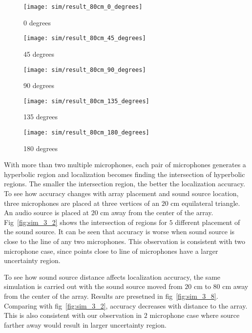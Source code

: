 \begin{figure*}[]
  \centering
  \begin{subfigure}[]{.3\textwidth}
    \texttt{[image: sim/result\_80cm\_0\_degrees]}
    \caption{0 degrees}
  \end{subfigure}
  \begin{subfigure}[]{.3\textwidth}
    \texttt{[image: sim/result\_80cm\_45\_degrees]}
    \caption{45 degrees}
  \end{subfigure}
  \begin{subfigure}[]{.3\textwidth}
    \texttt{[image: sim/result\_80cm\_90\_degrees]}
    \caption{90 degrees}
  \end{subfigure}
  \begin{subfigure}[]{.3\textwidth}
    \texttt{[image: sim/result\_80cm\_135\_degrees]}
    \caption{135 degrees}
  \end{subfigure}
  \begin{subfigure}[]{.3\textwidth}
    \texttt{[image: sim/result\_80cm\_180\_degrees]}
    \caption{180 degrees}
  \end{subfigure}
  \caption{$20$ cm equilateral triangle array. Source is $80$ cm away from the array}
  \label{fig:sim_3_8}
\end{figure*}

With more than two multiple microphones, each pair of microphones generates a hyperbolic region and localization becomes finding the intersection of hyperbolic regions. The smaller the intersection region, the better the localization accuracy. To see how accuracy changes with array placement and sound source location, three microphones are placed at three vertices of an $20$ cm equilateral triangle. An audio source is placed at $20$ cm away from the center of the array. Fig~\ref{fig:sim_3_2} shows the intersection of regions for $5$ different placement of the sound source. It can be seen that accuracy is worse when sound source is close to the line of any two microphones. This observation is consistent with two microphone case, since points close to line of microphones have a larger uncertainty region.

To see how sound source distance affects localization accuracy, the same simulation is carried out with the sound source moved from $20$ cm to $80$ cm away from the center of the array. Results are presetned in fig~\ref{fig:sim_3_8}. Comparing with fig~\ref{fig:sim_3_2}, accuracy decreases with distance to the array. This is also consistent with our observation in $2$ microphone case where source farther away would result in larger uncertainty region.

